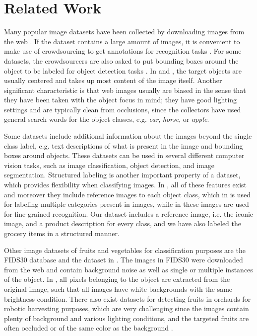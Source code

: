 \section{Related Work}\label{sec:related-work}

Many popular image datasets have been collected by downloading images from the web . 
If the dataset contains a large amount of images, it is convenient to make use of crowdsourcing to get annotations for recognition tasks . For some datasets, the crowdsourcers are also asked to put bounding boxes around the object to be labeled for object detection tasks . In  and , the target objects are usually centered and takes up most content of the image itself. Another significant characteristic is that web images usually are biased in the sense that they have been taken with the object focus in mind; they have good lighting settings and are typically clean from occlusions, since the collectors have used general search words for the object classes, e.g. \textit{car}, \textit{horse}, or \textit{apple}.

Some datasets include additional information about the images beyond the single class label, e.g. text descriptions of what is present in the image and bounding boxes around objects. These datasets can be used in several different computer vision tasks, such as image classification, object detection, and image segmentation. Structured labeling is another important property of a dataset, which provides flexibility when classifying images. In  , all of these features exist and moreover they include reference images to each object class, which in  is used for labeling multiple  categories present in images, while in  these images are used for fine-grained recognition. 
Our dataset includes a reference image, i.e. the iconic image, and a product description for every class, and we have also labeled the grocery items in a structured manner.

Other image datasets of fruits and vegetables for classification purposes are the FIDS30 database  and the dataset in . The images in FIDS30 were downloaded from the web and contain background noise as well as single or multiple instances of the object. In , all pixels belonging to the object are extracted from the original image, such that all images have white backgrounds with the same brightness condition. There also exist datasets for detecting fruits in orchards for robotic harvesting purposes, which are very challenging since the images contain plenty of background and various lighting conditions, and the targeted fruits are often occluded or of the same color as the background .


